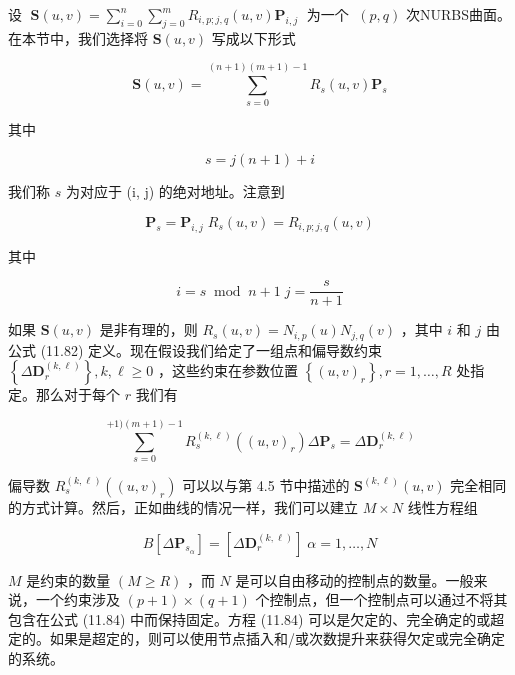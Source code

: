 \documentclass[../main.tex]{subfiles}
\begin{document}
设 \(\;\mathbf{S}\left( {u,v}\right)  = \mathop{\sum }\limits_{{i = 0}}^{n}\mathop{\sum }\limits_{{j = 0}}^{m}{R}_{i,p;j,q}\left( {u,v}\right) {\mathbf{P}}_{i,j}\;\) 为一个 \(\;\left( {p,q}\right)\) 次NURBS曲面。在本节中，我们选择将 \(\mathbf{S}\left( {u,v}\right)\) 写成以下形式

\[
\mathbf{S}\left( {u,v}\right)  = \mathop{\sum }\limits_{{s = 0}}^{{\left( {n + 1}\right) \left( {m + 1}\right)  - 1}}{R}_{s}\left( {u,v}\right) {\mathbf{P}}_{s} \tag{11.79}
\]

其中

\[
s = j\left( {n + 1}\right)  + i \tag{11.80}
\]

我们称 \(s\) 为对应于 (i, j) 的绝对地址。注意到

\[
{\mathbf{P}}_{s} = {\mathbf{P}}_{i,j}\;{R}_{s}\left( {u,v}\right)  = {R}_{i,p;j,q}\left( {u,v}\right)  \tag{11.81}
\]

其中

\[
i = s{\;\operatorname{mod}\;n} + 1\;j = \frac{s}{n + 1} \tag{11.82}
\]

如果 \(\mathbf{S}\left( {u,v}\right)\) 是非有理的，则 \({R}_{s}\left( {u,v}\right)  = {N}_{i,p}\left( u\right) {N}_{j,q}\left( v\right)\) ，其中 \(i\) 和 \(j\) 由公式 (11.82) 定义。现在假设我们给定了一组点和偏导数约束 \(\left\{  {\Delta {\mathbf{D}}_{r}^{\left( k,\ell \right) }}\right\}  ,k,\ell  \geq  0\) ，这些约束在参数位置 \(\left\{  {\left( u,v\right) }_{r}\right\}  ,r = 1,\ldots ,R\) 处指定。那么对于每个 \(r\) 我们有

\[
\mathop{\sum }\limits_{{s = 0}}^{{+1)\left( {m + 1}\right)  - 1}}{R}_{s}^{\left( k,\ell \right) }\left( {\left( u,v\right) }_{r}\right) \Delta {\mathbf{P}}_{s} = \Delta {\mathbf{D}}_{r}^{\left( k,\ell \right) } \tag{11.83}
\]

偏导数 \({R}_{s}^{\left( k,\ell \right) }\left( {\left( u,v\right) }_{r}\right)\) 可以以与第 4.5 节中描述的 \({\mathbf{S}}^{\left( k,\ell \right) }\left( {u,v}\right)\) 完全相同的方式计算。然后，正如曲线的情况一样，我们可以建立 \(M \times  N\) 线性方程组

\[
B\left\lbrack  {\Delta {\mathbf{P}}_{{s}_{\alpha }}}\right\rbrack   = \left\lbrack  {\Delta {\mathbf{D}}_{r}^{\left( k,\ell \right) }}\right\rbrack  \;\alpha  = 1,\ldots ,N \tag{11.84}
\]

\(M\) 是约束的数量 \(\left( {M \geq  R}\right)\) ，而 \(N\) 是可以自由移动的控制点的数量。一般来说，一个约束涉及 \(\left( {p + 1}\right)  \times  \left( {q + 1}\right)\) 个控制点，但一个控制点可以通过不将其包含在公式 (11.84) 中而保持固定。方程 (11.84) 可以是欠定的、完全确定的或超定的。如果是超定的，则可以使用节点插入和/或次数提升来获得欠定或完全确定的系统。
\end{document}
